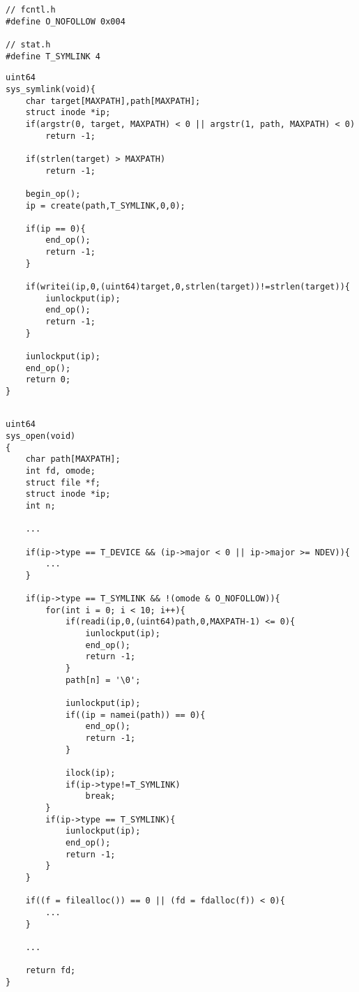 \begin{listing}[!htb]
	\begin{verbatim}
// fcntl.h
#define O_NOFOLLOW 0x004

// stat.h
#define T_SYMLINK 4
	\end{verbatim}
	\caption{添加相关宏定义}\label{lst:add_define}
\end{listing}

\begin{listing}[!htb]
	\begin{verbatim}
uint64
sys_symlink(void){
    char target[MAXPATH],path[MAXPATH];
    struct inode *ip;
    if(argstr(0, target, MAXPATH) < 0 || argstr(1, path, MAXPATH) < 0)
        return -1;
    
    if(strlen(target) > MAXPATH)
        return -1;
    
    begin_op();
    ip = create(path,T_SYMLINK,0,0);
    
    if(ip == 0){
        end_op();
        return -1;
    }
    
    if(writei(ip,0,(uint64)target,0,strlen(target))!=strlen(target)){
        iunlockput(ip);
        end_op();
        return -1;
    }
    
    iunlockput(ip);
    end_op();
    return 0;
}
		
	\end{verbatim}
	\caption{实现 sys\_symlink}\label{lst:sys_symlink}
\end{listing}

\begin{listing}[!htb]
	\begin{verbatim}
uint64
sys_open(void)
{
    char path[MAXPATH];
    int fd, omode;
    struct file *f;
    struct inode *ip;
    int n;

    ...	
    
    if(ip->type == T_DEVICE && (ip->major < 0 || ip->major >= NDEV)){
        ...
    }
    
    if(ip->type == T_SYMLINK && !(omode & O_NOFOLLOW)){
        for(int i = 0; i < 10; i++){
            if(readi(ip,0,(uint64)path,0,MAXPATH-1) <= 0){
                iunlockput(ip);
                end_op();
			    return -1;
			}
            path[n] = '\0';
            
            iunlockput(ip);
            if((ip = namei(path)) == 0){
                end_op();
                return -1;
            }
            
            ilock(ip);
            if(ip->type!=T_SYMLINK)
                break;
        }
        if(ip->type == T_SYMLINK){
            iunlockput(ip);
            end_op();
		    return -1;
        }
    }
    
    if((f = filealloc()) == 0 || (fd = fdalloc(f)) < 0){
        ...
    }
    
    ...
   
    return fd;
}		
	\end{verbatim}
	\caption{实现 sys\_open}\label{lst:sys_open}
\end{listing}

